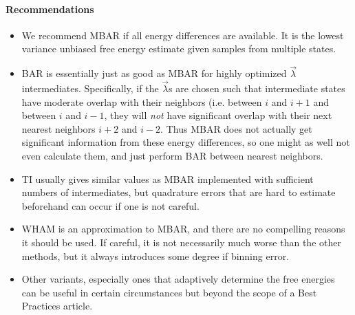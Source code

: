 \documentclass[9pt,bestpractices,pubversion]{livecoms}
\begin{document}
\paragraph{Recommendations}
\begin{itemize}
\item We recommend MBAR if all energy differences are available. It is the lowest variance unbiased free energy estimate given samples from multiple states.
\item BAR is essentially just as good as MBAR for highly optimized $\vec{\lambda}$ intermediates. Specifically, if the $\vec{\lambda}$s are chosen such that intermediate states have moderate overlap with their neighbors (i.e. between $i$ and $i+1$ and between $i$ and $i-1$, they will \textit{not} have significant overlap with their next nearest neighbors $i+2$ and $i-2$. Thus MBAR does not actually get significant information from these energy differences, so one might as well not even calculate them, and just perform BAR between nearest neighbors.~\cite{paliwal2011benchmark} 
\item TI usually gives similar values as MBAR implemented with sufficient numbers of intermediates, but quadrature errors that are hard to estimate beforehand  can occur if one is not careful.~\cite{paliwal2011benchmark}
\item WHAM is an approximation to MBAR, and there are no compelling reasons it should be used. If careful, it is not necessarily much worse than the other methods, but it always introduces some degree if binning error.
\item Other variants, especially ones that adaptively determine the free energies can be useful in certain circumstances but beyond the scope of a Best Practices article.
\end{itemize}
\end{document}
